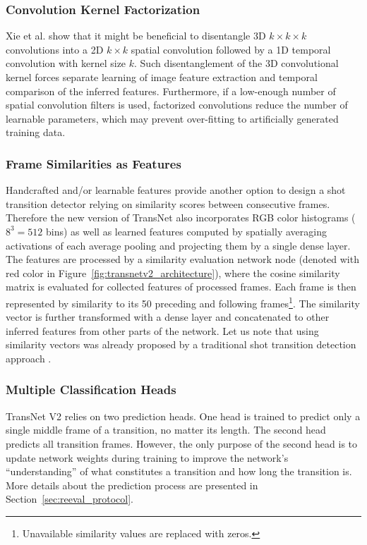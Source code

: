 \documentclass[sigconf]{acmart}
\begin{document}
\subsubsection{Convolution Kernel Factorization}
Xie et al. \cite{Xie_2018_ECCV} show that it might be beneficial to disentangle 3D $k \times k \times k$ convolutions into a 2D $k\times k$ spatial convolution followed by a 1D temporal convolution with kernel size $k$. Such disentanglement of the 3D convolutional kernel forces separate learning of image feature extraction and temporal comparison of the inferred features. Furthermore, if a low-enough number of spatial convolution filters is used, factorized convolutions reduce the number of learnable parameters, which may prevent over-fitting to artificially generated training data.


\subsubsection{Frame Similarities as Features}
Handcrafted and/or learnable features provide another option to design a shot transition detector relying on similarity scores between consecutive frames.
Therefore the new version of TransNet also incorporates RGB color histograms ($8^3=512$ bins) as well as learned features computed by spatially averaging activations of each average pooling and projecting them by a single dense layer. The features are processed by a similarity evaluation network node (denoted with red color in Figure~\ref{fig:transnetv2_architecture}), where the cosine similarity matrix is evaluated for collected features of processed frames. Each frame is then represented by similarity to its 50 preceding and following frames\footnote{Unavailable similarity values are replaced with zeros.}. The similarity vector is further transformed with a dense layer and concatenated to other inferred features from other parts of the network. Let us note that using similarity vectors was already proposed by a traditional shot transition detection approach \cite{CHASANIS_SVMonSimilarityVectors}.

\subsubsection{Multiple Classification Heads} 
TransNet V2 relies on two prediction heads. One head is trained to predict only a single middle frame of a transition, no matter its length. The second head predicts all transition frames. However, the only purpose of the second head is to update network weights during training to improve the network's ``understanding'' of what constitutes a transition and how long the transition is. More details about the prediction process are presented in Section~\ref{sec:reeval_protocol}.
\end{document}
